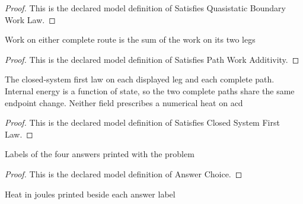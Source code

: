 \begin{proof}
  This is the declared model definition of Satisfies Quasistatic Boundary Work Law.
\end{proof}
\begin{definition}
  \label{def:physics:phyx-mini-0471:phyxminiproblems-problemphyxmini0471-satisfiespathworkadditivity}
  Work on either complete route is the sum of the work on its two legs
\end{definition}
\begin{proof}
  This is the declared model definition of Satisfies Path Work Additivity.
\end{proof}
\begin{definition}
  \label{def:physics:phyx-mini-0471:phyxminiproblems-problemphyxmini0471-satisfiesclosedsystemfirstlaw}
  The closed-system first law on each displayed leg and each complete path. Internal energy is a function of state, so the two complete paths share the same endpoint change. Neither field prescribes a numerical heat on acd
\end{definition}
\begin{proof}
  This is the declared model definition of Satisfies Closed System First Law.
\end{proof}
\begin{definition}
  \label{def:physics:phyx-mini-0471:phyxminiproblems-problemphyxmini0471-answerchoice}
  Labels of the four answers printed with the problem
\end{definition}
\begin{proof}
  This is the declared model definition of Answer Choice.
\end{proof}
\begin{definition}
  \label{def:physics:phyx-mini-0471:phyxminiproblems-problemphyxmini0471-answerchoice-displayedheatinjoules}
  Heat in joules printed beside each answer label
\end{definition}
